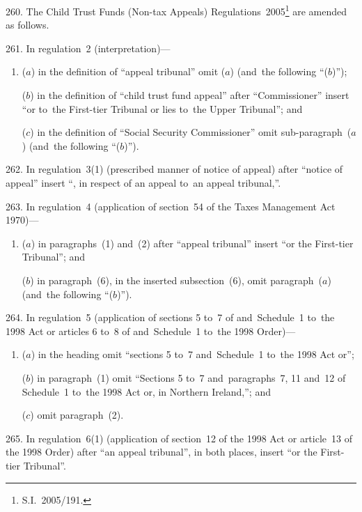 \documentclass[12pt,a4paper]{article}
\begin{document}
260.  The Child Trust Funds (Non-tax Appeals) Regulations~2005\footnote{S.I.~2005/191.} are amended as follows.

\medskip

261.  In regulation~2 (interpretation)—
\begin{enumerate}\item[]
($a$) in the definition of “appeal tribunal” omit ($a$)  (and~the following “($b$)”);

($b$) in the definition of “child trust fund appeal” after “Commissioner” insert “or to~the First-tier Tribunal or lies to~the Upper Tribunal”; and

($c$) in the definition of “Social Security Commissioner” omit sub-paragraph~($a$)  (and~the following “($b$)”).
\end{enumerate}

\medskip

262.  In regulation~3(1) (prescribed manner of notice of appeal) after “notice of appeal” insert “, in respect of an appeal to~an appeal tribunal,”.

\medskip

263.  In regulation~4 (application of section~54 of the Taxes Management Act 1970)—
\begin{enumerate}\item[]
($a$) in paragraphs~(1) and~(2) after “appeal tribunal” insert “or the First-tier Tribunal”; and

($b$) in paragraph~(6), in the inserted subsection~(6), omit paragraph~($a$)  (and~the following “($b$)”).
\end{enumerate}

\medskip

264.  In regulation~5 (application of sections 5 to~7 of and~Schedule~1 to~the 1998 Act or articles 6 to~8 of and~Schedule~1 to~the 1998 Order)—
\begin{enumerate}\item[]
($a$) in the heading omit “sections 5 to~7 and~Schedule~1 to~the 1998 Act or”;

($b$) in paragraph~(1) omit “Sections 5 to~7 and~paragraphs~7, 11 and~12 of Schedule~1 to~the 1998 Act or, in Northern Ireland,”; and

($c$) omit paragraph~(2).
\end{enumerate}

\medskip

265.  In regulation~6(1) (application of section~12 of the 1998 Act or article~13 of the 1998 Order) after “an appeal tribunal”, in both places, insert “or the First-tier Tribunal”.
\end{document}
